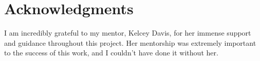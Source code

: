 \documentclass[twoside,twocolumn,10pt]{article}
\begin{document}
\section{Acknowledgments}
\fontsize{11}{13}\selectfont

{I am incredibly grateful to my mentor, Kelcey Davis, for her immense support and guidance throughout this project. Her mentorship was extremely important to the success of this work, and I couldn't have done it without her.
}


\onecolumn %

{}

\end{document}
